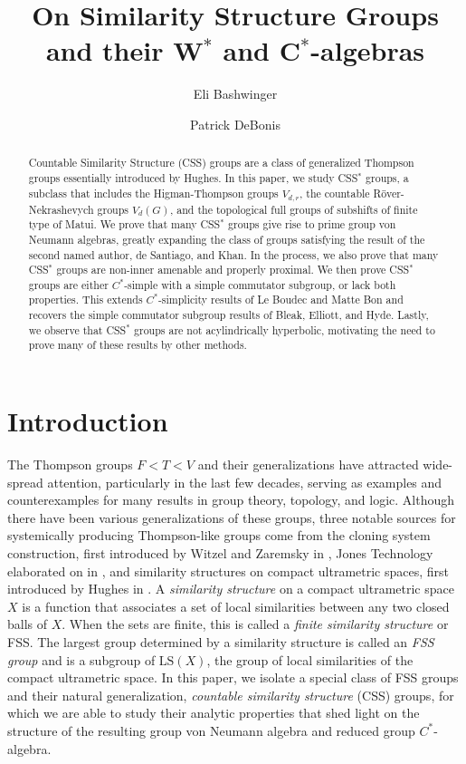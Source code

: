 \documentclass[12pt]{amsart}
\title[On Similarity Structure Groups]{On Similarity Structure Groups and their W$^*$ and C$^*$-algebras}
\author[E. Bashwinger]{Eli Bashwinger}
\author[P. DeBonis]{Patrick DeBonis}
\numberwithin{equation}{subsection}
\theoremstyle{definition}
\theoremstyle{definition}
\theoremstyle{remark}
\begin{document}
\begin{abstract}
    Countable Similarity Structure (CSS) groups are a class of generalized Thompson groups essentially introduced by Hughes. In this paper, we study CSS$^*$ groups, a subclass that includes the Higman-Thompson groups $V_{d,r}$, the countable R\"over-Nekrashevych groups $V_d(G)$, and the topological full groups of subshifts of finite type of Matui. We prove that many CSS$^*$ groups give rise to prime group von Neumann algebras, greatly expanding the class of groups satisfying the result of the second named author, de Santiago, and Khan. In the process, we also prove that many CSS$^*$ groups are non-inner amenable and properly proximal. We then prove CSS$^*$ groups are either $C^*$-simple with a simple commutator subgroup, or lack both properties. This extends $C^*$-simplicity results of Le Boudec and Matte Bon and recovers the simple commutator subgroup results of Bleak, Elliott, and Hyde. Lastly, we observe that CSS$^*$ groups are not acylindrically hyperbolic, motivating the need to prove many of these results by other methods.  
    
\end{abstract}




\maketitle


\tableofcontents

\section{Introduction}


The Thompson groups $F < T < V$ and their generalizations have attracted wide-spread attention, particularly in the last few decades, serving as examples and counterexamples for many results in group theory, topology, and logic. Although there have been various generalizations of these groups, three notable sources for systemically producing Thompson-like groups come from the cloning system construction, first introduced by Witzel and Zaremsky in \cite{witzel2018thompson}, Jones Technology elaborated on in \cite{brothier2023}, and similarity structures on compact ultrametric spaces, first introduced by Hughes in \cite{hughes2009}. A \emph{similarity structure} on a compact ultrametric space $X$ is a function that associates a set of local similarities between any two closed balls of $X$. When the sets are finite, this is called a \emph{finite similarity structure} or FSS. The largest group determined by a similarity structure is called an \emph{FSS group} and is a subgroup of $\text{LS}(X)$, the group of local similarities of the compact ultrametric space. In this paper, we isolate a special class of FSS groups and their natural generalization, \emph{countable similarity structure} (CSS) groups, for which we are able to study their analytic properties that shed light on the structure of the resulting group von Neumann algebra and reduced group $C^*$-algebra. 
\end{document}
